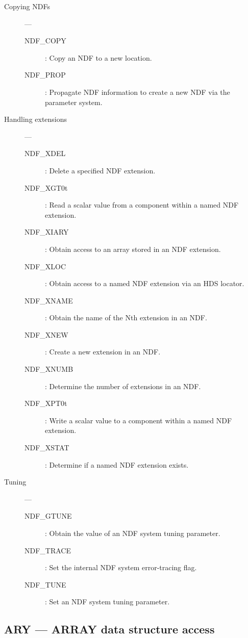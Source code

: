 \begin{description}
\item [Copying NDFs] ---

\begin{description}
\item [NDF\_COPY] : Copy an NDF to a new location.
\item [NDF\_PROP] : Propagate NDF information to create a new NDF via the parameter system.
\end{description}

\item [Handling extensions] ---

\begin{description}
\item [NDF\_XDEL] : Delete a specified NDF extension.
\item [NDF\_XGT0t] : Read a scalar value from a component within a named NDF extension.
\item [NDF\_XIARY] : Obtain access to an array stored in an NDF extension.
\item [NDF\_XLOC] : Obtain access to a named NDF extension via an HDS locator.
\item [NDF\_XNAME] : Obtain the name of the Nth extension in an NDF.
\item [NDF\_XNEW] : Create a new extension in an NDF.
\item [NDF\_XNUMB] : Determine the number of extensions in an NDF.
\item [NDF\_XPT0t] : Write a scalar value to a component within a named NDF extension.
\item [NDF\_XSTAT] : Determine if a named NDF extension exists.
\end{description}

\item [Tuning] ---

\begin{description}
\item [NDF\_GTUNE] : Obtain the value of an NDF system tuning parameter.
\item [NDF\_TRACE] : Set the internal NDF system error-tracing flag.
\item [NDF\_TUNE] : Set an NDF system tuning parameter.
\end{description}

\end{description}

\newpage

\subsection{ARY --- ARRAY data structure access} 

